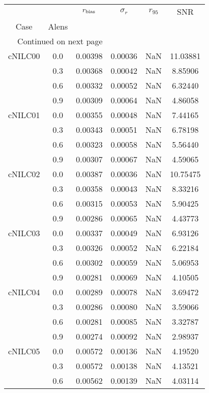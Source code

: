 \begin{longtable}{cccccc}
\toprule
        &     &  $r_{\rm bias}$  &  $\sigma_r$ &  $r_{95}$ &      SNR \\
Case & Alens &                  &             &           &          \\
\midrule
\endhead
\midrule
\multicolumn{3}{r}{{Continued on next page}} \\
\midrule
\endfoot

\bottomrule
\endlastfoot
cNILC00 & 0.0 & 0.00398 & 0.00036 & NaN & 11.03881 \\
        & 0.3 & 0.00368 & 0.00042 & NaN & 8.85906 \\
        & 0.6 & 0.00332 & 0.00052 & NaN & 6.32440 \\
        & 0.9 & 0.00309 & 0.00064 & NaN & 4.86058 \\
cNILC01 & 0.0 & 0.00355 & 0.00048 & NaN & 7.44165 \\
        & 0.3 & 0.00343 & 0.00051 & NaN & 6.78198 \\
        & 0.6 & 0.00323 & 0.00058 & NaN & 5.56440 \\
        & 0.9 & 0.00307 & 0.00067 & NaN & 4.59065 \\
cNILC02 & 0.0 & 0.00387 & 0.00036 & NaN & 10.75475 \\
        & 0.3 & 0.00358 & 0.00043 & NaN & 8.33216 \\
        & 0.6 & 0.00315 & 0.00053 & NaN & 5.90425 \\
        & 0.9 & 0.00286 & 0.00065 & NaN & 4.43773 \\
cNILC03 & 0.0 & 0.00337 & 0.00049 & NaN & 6.93126 \\
        & 0.3 & 0.00326 & 0.00052 & NaN & 6.22184 \\
        & 0.6 & 0.00302 & 0.00059 & NaN & 5.06953 \\
        & 0.9 & 0.00281 & 0.00069 & NaN & 4.10505 \\
cNILC04 & 0.0 & 0.00289 & 0.00078 & NaN & 3.69472 \\
        & 0.3 & 0.00286 & 0.00080 & NaN & 3.59066 \\
        & 0.6 & 0.00281 & 0.00085 & NaN & 3.32787 \\
        & 0.9 & 0.00274 & 0.00092 & NaN & 2.98937 \\
cNILC05 & 0.0 & 0.00572 & 0.00136 & NaN & 4.19520 \\
        & 0.3 & 0.00572 & 0.00138 & NaN & 4.13521 \\
        & 0.6 & 0.00562 & 0.00139 & NaN & 4.03114 \\

\end{longtable}
